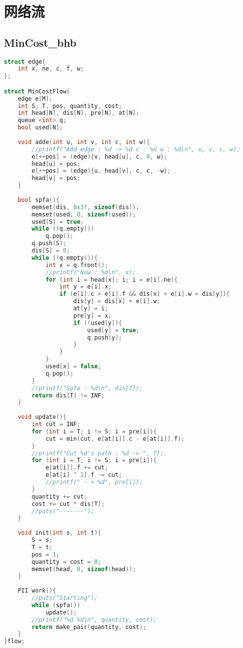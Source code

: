 \section{网络流}
\subsection{MinCost\_bhb}
\begin{lstlisting}[language=C++]
struct edge{
	int x, ne, c, f, w;
};

struct MinCostFlow{
	edge e[M];
	int S, T, pos, quantity, cost;
	int head[N], dis[N], pre[N], at[N];
	queue <int> q;
	bool used[N];
	
	void adde(int u, int v, int c, int w){
		//printf("Add edge : %d -> %d c : %d w : %d\n", u, v, c, w);
		e[++pos] = (edge){v, head[u], c, 0, w};
		head[u] = pos;
		e[++pos] = (edge){u, head[v], c, c, -w};
		head[v] = pos;
	}
	
	bool spfa(){
		memset(dis, 0x3f, sizeof(dis));
		memset(used, 0, sizeof(used));
		used[S] = true;
		while (!q.empty())
			q.pop();
		q.push(S);
		dis[S] = 0;
		while (!q.empty()){
			int x = q.front();
			//printf("Now : %d\n", x);
			for (int i = head[x]; i; i = e[i].ne){
				int y = e[i].x;
				if (e[i].c > e[i].f && dis[x] + e[i].w < dis[y]){
					dis[y] = dis[x] + e[i].w;
					at[y] = i;
					pre[y] = x;
					if (!used[y]){
						used[y] = true;
						q.push(y);
					}
				}
			}
			used[x] = false;
			q.pop();
		}
		//printf("Spfa : %d\n", dis[T]);
		return dis[T] != INF;
	}
	
	void update(){
		int cut = INF;
		for (int i = T; i != S; i = pre[i]){
			cut = min(cut, e[at[i]].c - e[at[i]].f);
		}
		//printf("Cut %d's path : %d -> ", T);
		for (int i = T; i != S; i = pre[i]){
			e[at[i]].f += cut;
			e[at[i] ^ 1].f -= cut;
			//printf(" - > %d", pre[i]);
		}
		quantity += cut;
		cost += cut * dis[T];
		//puts("-------");
	}
	
	void init(int s, int t){
		S = s;
		T = t;
		pos = 1;
		quantity = cost = 0;
		memset(head, 0, sizeof(head));
	}
	
	PII work(){
		//puts("Starting");
		while (spfa())
			update();
		//printf("%d %d\n", quantity, cost);
		return make_pair(quantity, cost);
	}
}flow;
\end{lstlisting}
